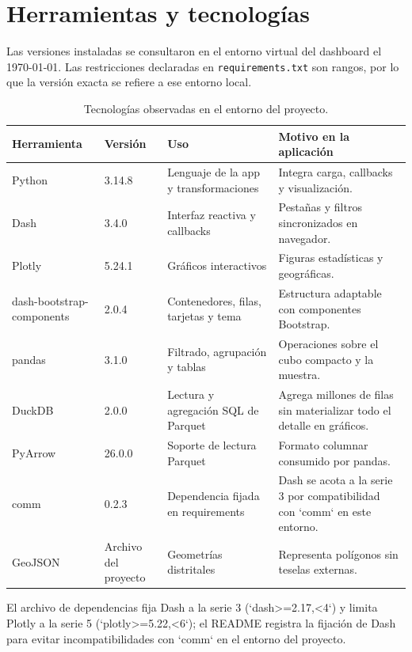 \documentclass[11pt,a4paper]{article}
\begin{document}
\section{Herramientas y tecnologías}
Las versiones instaladas se consultaron en el entorno virtual del dashboard el \today. Las restricciones declaradas en \texttt{requirements.txt} son rangos, por lo que la versión exacta se refiere a ese entorno local.
\begin{table}[H]\centering\small
\begin{tabularx}{\textwidth}{l l Y Y}\toprule
Herramienta & Versión & Uso & Motivo en la aplicación\\\midrule
Python & 3.14.8 & Lenguaje de la app y transformaciones & Integra carga, callbacks y visualización.\\
Dash & 3.4.0 & Interfaz reactiva y callbacks & Pestañas y filtros sincronizados en navegador.\\
Plotly & 5.24.1 & Gráficos interactivos & Figuras estadísticas y geográficas.\\
dash-bootstrap-components & 2.0.4 & Contenedores, filas, tarjetas y tema & Estructura adaptable con componentes Bootstrap.\\
pandas & 3.1.0 & Filtrado, agrupación y tablas & Operaciones sobre el cubo compacto y la muestra.\\
DuckDB & 2.0.0 & Lectura y agregación SQL de Parquet & Agrega millones de filas sin materializar todo el detalle en gráficos.\\
PyArrow & 26.0.0 & Soporte de lectura Parquet & Formato columnar consumido por pandas.\\
comm & 0.2.3 & Dependencia fijada en requirements & Dash se acota a la serie 3 por compatibilidad con `comm` en este entorno.\\
GeoJSON & Archivo del proyecto & Geometrías distritales & Representa polígonos sin teselas externas.\\
\bottomrule\end{tabularx}\caption{Tecnologías observadas en el entorno del proyecto.}\label{tab:tecnologias}
\end{table}
El archivo de dependencias fija Dash a la serie 3 (`dash>=2.17,<4`) y limita Plotly a la serie 5 (`plotly>=5.22,<6`); el README registra la fijación de Dash para evitar incompatibilidades con `comm` en el entorno del proyecto.
\end{document}
